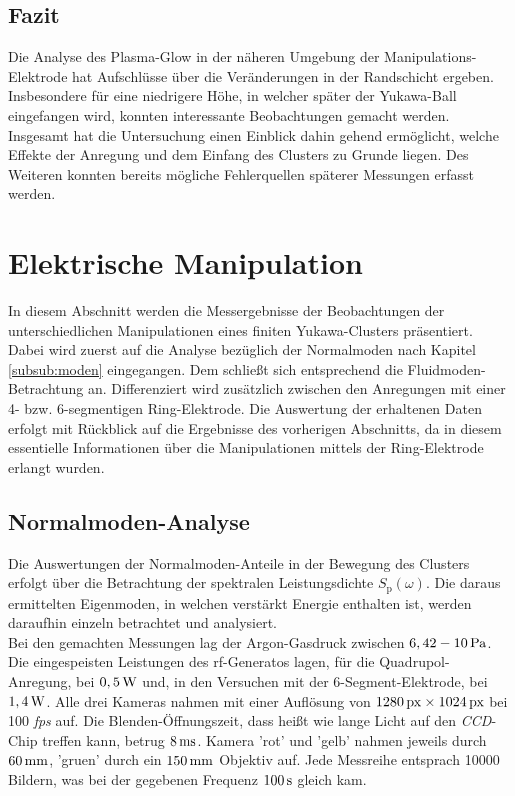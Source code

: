 \documentclass[numbers=noenddot,a4paper,notitlepage,twoside,BCOR15mm]{scrbook}
\newcommand{\ix}[1]{_\text{#1}}
\newcommand{\tilt}[1]{\textit{#1}}
\begin{document}
	\newpage

				\subsection*{Fazit}

						Die Analyse des Plasma-Glow in der näheren Umgebung der Manipulations-Elektrode hat Aufschlüsse über die Veränderungen in der Randschicht ergeben. Insbesondere für eine niedrigere Höhe, in welcher später der Yukawa-Ball eingefangen wird, konnten interessante Beobachtungen gemacht werden. Insgesamt hat die Untersuchung einen Einblick dahin gehend ermöglicht, welche Effekte der Anregung und dem Einfang des Clusters zu Grunde liegen. Des Weiteren konnten bereits mögliche Fehlerquellen späterer Messungen erfasst werden.

			\newpage

		\section{Elektrische Manipulation}\label{sec:manip}

			In diesem Abschnitt werden die Messergebnisse der Beobachtungen der unterschiedlichen Manipulationen eines finiten Yukawa-Clusters präsentiert. Dabei wird zuerst auf die Analyse bezüglich der Normalmoden nach Kapitel \ref{subsub:moden} eingegangen. Dem schließt sich entsprechend die Fluidmoden-Betrachtung an. Differenziert wird zusätzlich zwischen den Anregungen mit einer 4- bzw. 6-segmentigen Ring-Elektrode. Die Auswertung der erhaltenen Daten erfolgt mit Rückblick auf die Ergebnisse des vorherigen Abschnitts, da in diesem essentielle Informationen über die Manipulationen mittels der Ring-Elektrode erlangt wurden.

			\subsection{Normalmoden-Analyse}

				Die Auswertungen der Normalmoden-Anteile in der Bewegung des Clusters erfolgt über die Betrachtung der spektralen Leistungsdichte $S\ix{p}\left(\omega\right)$. Die daraus ermittelten Eigenmoden, in welchen verstärkt Energie enthalten ist, werden daraufhin einzeln betrachtet und analysiert.\\
				Bei den gemachten Messungen lag der Argon-Gasdruck zwischen $\unit[6,42-10]{Pa}$. Die eingespeisten Leistungen des rf-Generatos lagen, für die Quadrupol-Anregung, bei $\unit[0,5]{W}$ und, in den Versuchen mit der 6-Segment-Elektrode, bei $\unit[1,4]{W}$. Alle drei Kameras nahmen mit einer Auflösung von $\unit[1280]{px}\times\unit[1024]{px}$ bei 100 \tilt{fps} auf. Die Blenden-Öffnungszeit, dass heißt wie lange Licht auf den \tilt{CCD}-Chip treffen kann, betrug $\unit[8]{ms}$. Kamera 'rot' und 'gelb' nahmen jeweils durch $\unit[60]{mm}$, 'gruen' durch ein $\unit[150]{mm}$ Objektiv auf. Jede Messreihe entsprach 10000 Bildern, was bei der gegebenen Frequenz $\unit[100]{s}$ gleich kam.
\end{document}
